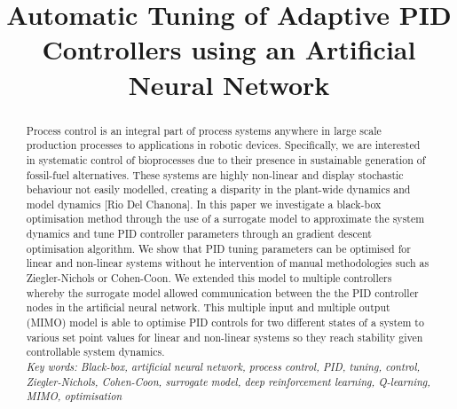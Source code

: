 \documentclass[conference]{IEEEtran}
\theoremstyle{definition}
\begin{document}
\title{Automatic Tuning of Adaptive PID Controllers using an Artificial Neural Network}


\author{
}

\maketitle

\begin{abstract}
Process control is an integral part of process systems anywhere in large scale production processes to applications in robotic devices. Specifically, we are interested in systematic control of bioprocesses due to their presence in sustainable generation of fossil-fuel alternatives. These systems are highly non-linear and display stochastic behaviour not easily modelled, creating a disparity in the plant-wide dynamics and model dynamics [Rio Del Chanona]. In this paper we investigate a black-box optimisation method through the use of a surrogate model to approximate the system dynamics and tune PID controller parameters through an gradient descent optimisation algorithm. We show that PID tuning parameters can be optimised for linear and non-linear systems without he intervention of manual methodologies such as Ziegler-Nichols or Cohen-Coon. We extended this model to multiple controllers whereby the surrogate model allowed communication between the the PID controller nodes in the artificial neural network. This multiple input and multiple output (MIMO) model is able to optimise PID controls for two different states of a system to various set point values for linear and non-linear systems so they reach stability given controllable system dynamics. \\

\noindent \textit{Key words: Black-box, artificial neural network, process control, PID, tuning, control, Ziegler-Nichols, Cohen-Coon, surrogate model, deep reinforcement learning, Q-learning, MIMO, optimisation}\end{abstract}

\IEEEpeerreviewmaketitle
\end{document}
